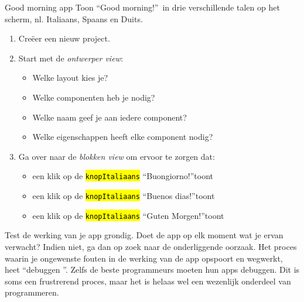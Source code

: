 \begin{opdracht}{Good morning app}
	Toon \textquotedblleft Good morning!\textquotedblright \ in drie verschillende talen op het scherm, nl. Italiaans, Spaans en Duits.
	
	\begin{minipage}{.5\linewidth}
	\end{minipage}
	\begin{minipage}{.5\linewidth}
		\begin{enumerate}
			\item Cre\"eer een nieuw project.
			\item Start met de \emph{ontwerper view}:
			\begin{itemize}
				\item Welke layout kies je?
				\item Welke componenten heb je nodig?
				\item Welke naam geef je aan iedere component?
				\item Welke eigenschappen heeft elke component nodig?
			\end{itemize}
			\item Ga over naar de \emph{blokken view} om ervoor te zorgen dat:
			\begin{itemize}
				\item een klik op de \hl{\texttt{knopItaliaans}} \textquotedblleft Buongiorno!\textquotedblright toont
				\item een klik op de \hl{\texttt{knopItaliaans}} \textquotedblleft Buenos dias!\textquotedblright toont
				\item een klik op de \hl{\texttt{knopItaliaans}} \textquotedblleft Guten Morgen!\textquotedblright toont
			\end{itemize}
		\end{enumerate}
	\end{minipage}

Test de werking van je app grondig. Doet de app op elk moment wat je ervan verwacht? Indien niet, ga dan op zoek naar de onderliggende oorzaak. Het proces waarin je ongewenste fouten in de werking van de app opspoort en wegwerkt, heet \textquotedblleft debuggen \textquotedblright. Zelfs de beste programmeurs moeten hun apps debuggen. Dit is soms een frustrerend proces, maar het is helaas wel een wezenlijk onderdeel van programmeren.

\end{opdracht}

